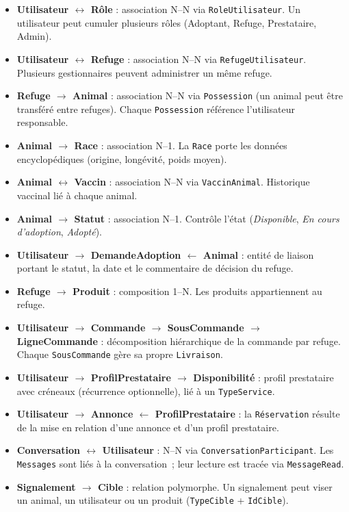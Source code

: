 \documentclass[12pt,a4paper]{report}
\begin{document}
\begin{itemize}[leftmargin=2em,itemsep=3pt]
  \item \textbf{Utilisateur $\leftrightarrow$ Rôle} : association N--N via \texttt{RoleUtilisateur}. Un utilisateur peut cumuler plusieurs rôles (Adoptant, Refuge, Prestataire, Admin).
  \item \textbf{Utilisateur $\leftrightarrow$ Refuge} : association N--N via \texttt{RefugeUtilisateur}. Plusieurs gestionnaires peuvent administrer un même refuge.
  \item \textbf{Refuge $\rightarrow$ Animal} : association N--N via \texttt{Possession} (un animal peut être transféré entre refuges). Chaque \texttt{Possession} référence l'utilisateur responsable.
  \item \textbf{Animal $\rightarrow$ Race} : association N--1. La \texttt{Race} porte les données encyclopédiques (origine, longévité, poids moyen).
  \item \textbf{Animal $\leftrightarrow$ Vaccin} : association N--N via \texttt{VaccinAnimal}. Historique vaccinal lié à chaque animal.
  \item \textbf{Animal $\rightarrow$ Statut} : association N--1. Contrôle l'état (\textit{Disponible}, \textit{En cours d'adoption}, \textit{Adopté}).
  \item \textbf{Utilisateur $\rightarrow$ DemandeAdoption $\leftarrow$ Animal} : entité de liaison portant le statut, la date et le commentaire de décision du refuge.
  \item \textbf{Refuge $\rightarrow$ Produit} : composition 1--N. Les produits appartiennent au refuge.
  \item \textbf{Utilisateur $\rightarrow$ Commande $\rightarrow$ SousCommande $\rightarrow$ LigneCommande} : décomposition hiérarchique de la commande par refuge. Chaque \texttt{SousCommande} gère sa propre \texttt{Livraison}.
  \item \textbf{Utilisateur $\rightarrow$ ProfilPrestataire $\rightarrow$ Disponibilité} : profil prestataire avec créneaux (récurrence optionnelle), lié à un \texttt{TypeService}.
  \item \textbf{Utilisateur $\rightarrow$ Annonce $\leftarrow$ ProfilPrestataire} : la \texttt{Réservation} résulte de la mise en relation d'une annonce et d'un profil prestataire.
  \item \textbf{Conversation $\leftrightarrow$ Utilisateur} : N--N via \texttt{ConversationParticipant}. Les \texttt{Messages} sont liés à la conversation~; leur lecture est tracée via \texttt{MessageRead}.
  \item \textbf{Signalement $\rightarrow$ Cible} : relation polymorphe. Un signalement peut viser un animal, un utilisateur ou un produit (\texttt{TypeCible} + \texttt{IdCible}).
\end{itemize}
\end{document}
